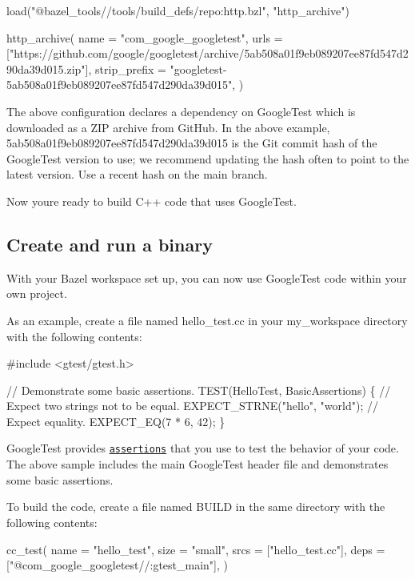 \begin{DoxyCode}
load("@bazel\_tools//tools/build\_defs/repo:http.bzl", "http\_archive")

http\_archive(
  name = "com\_google\_googletest",
  urls = ["https://github.com/google/googletest/archive/5ab508a01f9eb089207ee87fd547d290da39d015.zip"],
  strip\_prefix = "googletest-5ab508a01f9eb089207ee87fd547d290da39d015",
)
\end{DoxyCode}


The above configuration declares a dependency on Google\+Test which is downloaded as a Z\+IP archive from Git\+Hub. In the above example, {\ttfamily 5ab508a01f9eb089207ee87fd547d290da39d015} is the Git commit hash of the Google\+Test version to use; we recommend updating the hash often to point to the latest version. Use a recent hash on the {\ttfamily main} branch.

Now you\textquotesingle{}re ready to build C++ code that uses Google\+Test.

\subsection*{Create and run a binary}

With your Bazel workspace set up, you can now use Google\+Test code within your own project.

As an example, create a file named {\ttfamily hello\+\_\+test.\+cc} in your {\ttfamily my\+\_\+workspace} directory with the following contents\+:


\begin{DoxyCode}
\textcolor{preprocessor}{#include <gtest/gtest.h>}

\textcolor{comment}{// Demonstrate some basic assertions.}
TEST(HelloTest, BasicAssertions) \{
  \textcolor{comment}{// Expect two strings not to be equal.}
  EXPECT\_STRNE(\textcolor{stringliteral}{"hello"}, \textcolor{stringliteral}{"world"});
  \textcolor{comment}{// Expect equality.}
  EXPECT\_EQ(7 * 6, 42);
\}
\end{DoxyCode}


Google\+Test provides \href{primer.md#assertions}{\tt assertions} that you use to test the behavior of your code. The above sample includes the main Google\+Test header file and demonstrates some basic assertions.

To build the code, create a file named {\ttfamily B\+U\+I\+LD} in the same directory with the following contents\+:


\begin{DoxyCode}
cc\_test(
  name = "hello\_test",
  size = "small",
  srcs = ["hello\_test.cc"],
  deps = ["@com\_google\_googletest//:gtest\_main"],
)
\end{DoxyCode}


